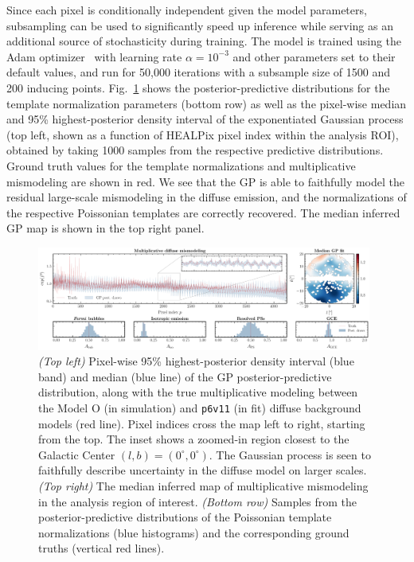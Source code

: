 \documentclass[]{article}
\begin{document}
Since each pixel is conditionally independent given the model parameters, subsampling can be used to significantly speed up inference while serving as an additional source of stochasticity during training. The model is trained using the Adam optimizer~\cite{DBLP:journals/corr/KingmaB14} with learning rate $\alpha=10^{-3}$ and other parameters set to their default values, and run for 50,000 iterations with a subsample size of 1500 and 200 inducing points.
Fig.~\ref{fig:experiment} shows the posterior-predictive distributions for the template normalization parameters (bottom row) as well as the pixel-wise median and 95\% highest-posterior density interval of the exponentiated Gaussian process (top left, shown as a function of HEALPix pixel index within the analysis ROI), obtained by taking 1000 samples from the respective predictive distributions. Ground truth values for the template normalizations and multiplicative mismodeling are shown in red. We see that the GP is able to faithfully model the residual large-scale mismodeling in the diffuse emission, and the normalizations of the respective Poissonian templates are correctly recovered. The median inferred GP map is shown in the top right panel.

\begin{figure}[!t]
  \centering
  \includegraphics[width=0.98\textwidth]{figures/inference}
  \caption{\emph{(Top left)} Pixel-wise 95\% highest-posterior density interval (blue band) and median (blue line) of the GP posterior-predictive distribution, along with the true multiplicative modeling between the Model O (in simulation) and \texttt{p6v11} (in fit) diffuse background models (red line). Pixel indices cross the map left to right, starting from the top. The inset shows a zoomed-in region closest to the Galactic Center $(l, b) = (0^\circ, 0^\circ)$. The Gaussian process is seen to faithfully describe uncertainty in the diffuse model on larger scales. \emph{(Top right)} The median inferred map of multiplicative mismodeling in the analysis region of interest. \emph{(Bottom row)} Samples from the posterior-predictive distributions of the Poissonian template normalizations (blue histograms) and the corresponding ground truths (vertical red lines).}
  \label{fig:experiment}
\end{figure}
  
\end{document}
